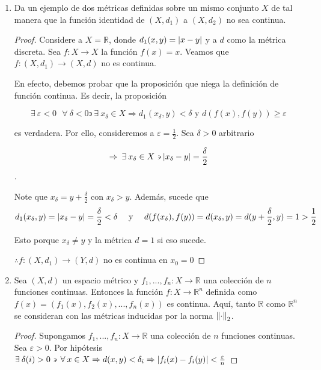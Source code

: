 \documentclass[12pt]{article}
\newcommand\R{\ensuremath{\mathbb{R}}}
\begin{document}
\begin{enumerate}[label=\textbf{\arabic*}.]
\begin{proof}
    $\therefore d_\infty$ es métrica en $\mathcal{B}(X,Y)$
\end{proof}

\item Da un ejemplo de dos métricas definidas sobre un mismo conjunto $X$ de tal manera que la función identidad de $(X, d_1) $ a $(X, d_2)$ no sea continua.

\begin{proof}
     Considere a $X=\R$, donde $d_1(x,y) = \abs{x-y}$ y  a $d$ como la métrica discreta. Sea $f : X \to X$ la función $f(x) = x$. Veamos que $f : (X, d_1) \to (X,d)$ no es continua. 

     En efecto, debemos probar que la proposición que niega la definición de función continua. Es decir, la proposición

    \begin{equation*}
        \exists \: \varepsilon < 0 \: \: \: \forall \: \delta < 0 \backepsilon \: \exists \: {x}_{\delta} \in X \Rightarrow  {d}_{1}({x}_{\delta},y) < \delta \text{ y } d(f(x),f(y)) \geqslant \varepsilon 
    \end{equation*}

    es verdadera. Por ello, consideremos a $\varepsilon = \frac{1}{2}$. Sea $\delta > 0$ arbitrario
    
    $$\Rightarrow \: \exists \: x_\delta \in X \backepsilon \abs{x_\delta - y} = \frac{\delta}{2}$$. 
    
    Note que $ x_\delta = y + \frac{\delta}{2}$ con $x_\delta > y$. Además, sucede que 
    \begin{align*}
        {d}_{1}({x}_{\delta},y) = \abs{x_\delta - y} = \frac{\delta}{2} < \delta && \text{ y }&& d(f({x}_{\delta}),f(y)) = d(x_\delta,y) = d(y + \frac{\delta}{2}, y) = 1 > \frac{1}{2}
    \end{align*}

    Esto porque $x_\delta \neq y$ y la métrica $d = 1$ si eso sucede. 
    
    $\therefore f:(X,{d}_{1}) \to (Y,d)$ no es continua en $x_0 = 0$
\end{proof}

\item Sea $(X, d)$ un espacio métrico y $f_1, ..., f_n : X \to \R$ una colección de $n$ funciones continuas. Entonces la función $f : X \to \R^n$ definida como $f(x)=(f_1(x), f_2(x), ..., f_n(x))$ es continua. Aquí, tanto $\R$
como $\R^n$ se consideran con las métricas inducidas por la norma ${\norm{\cdot}}_{2}$.

\begin{proof}
    Supongamos $f_1, ..., f_n : X \to \R$ una colección de $n$ funciones continuas. Sea $\varepsilon > 0$. Por hipótesis $\exists \: \delta(i) > 0 \backepsilon \: \forall \: x \in X \Rightarrow d(x,y) < \delta_i \Rightarrow \abs{f_i(x) - f_i(y)} < \frac{\varepsilon}{n}$ 


\end{proof}
\end{enumerate}
\end{document}
